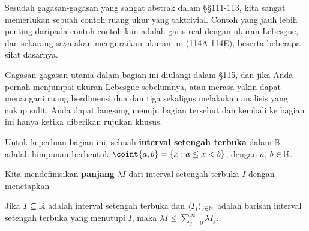 
\def\chaptername{Ruang ukur}
\def\sectionname{Ukuran Lebesgue pada $\Bbb R$}

\def\headlinesectionname{Ukuran Lebesgue pada ${\eightBbb R}$}

Sesudah gagasan-gagasan yang sangat abstrak dalam \S\S111-113, kita
sangat memerlukan sebuah contoh ruang ukur yang taktrivial. Contoh yang
jauh lebih penting daripada contoh-contoh lain adalah garis real dengan
ukuran Lebesgue, dan
sekarang saya akan menguraikan ukuran ini (114A-114E), beserta beberapa
sifat dasarnya.

Gagasan-gagasan utama dalam bagian ini diulangi dalam \S115, dan jika
Anda pernah menjumpai ukuran Lebesgue sebelumnya, atau merasa yakin
dapat menangani ruang berdimensi dua dan tiga sekaligus melakukan
analisis yang cukup sulit, Anda dapat langsung menuju bagian tersebut
dan kembali ke bagian ini hanya ketika diberikan rujukan khusus.

 Untuk keperluan bagian ini, sebuah {\bf
interval setengah terbuka} dalam $\Bbb R$ adalah himpunan berbentuk
$\coint{a,b}=\{x:a\le x<b\}$, dengan $a$, $b\in\Bbb R$.


 Kita
mendefinisikan {\bf panjang} $\lambda I$ dari interval setengah terbuka
$I$ dengan menetapkan


 Jika $I\subseteq\Bbb R$ adalah interval setengah
terbuka dan $\langle I_j\rangle_{j\in\Bbb N}$ adalah barisan interval
setengah terbuka yang menutupi $I$, maka
$\lambda I\le\sum_{j=0}^{\infty}\lambda I_j$.

